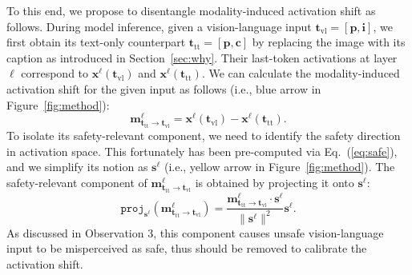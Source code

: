 To this end, we propose to disentangle modality-induced activation shift as follows. During model inference, given a vision-language input $\mathbf{t}_\text{vl}=[\mathbf{p}, \mathbf{i}]$, we first obtain its text-only counterpart $\mathbf{t}_\text{tt}=[\mathbf{p}, \mathbf{c}]$ by replacing the image with its caption as introduced in Section~\ref{sec:why}. Their last-token activations at layer $\ell$ correspond to $\mathbf{x}^\ell (\mathbf{t}_\text{vl})$ and $\mathbf{x}^\ell (\mathbf{t}_\text{tt})$. We can calculate the modality-induced activation shift for the given input as follows (i.e., blue arrow in Figure~\ref{fig:method}):
\begin{equation}
    \mathbf{m}^\ell_{\mathbf{t}_\text{tt}\rightarrow \mathbf{t}_\text{vl}} = \mathbf{x}^\ell (\mathbf{t}_\text{vl}) - \mathbf{x}^\ell (\mathbf{t}_\text{tt}).
\end{equation}
To isolate its safety-relevant component, we need to identify the safety direction in activation space. This fortunately has been pre-computed via Eq.~(\ref{eq:safe}), and we simplify its notion as $\mathbf{s}^\ell$ (i.e., yellow arrow in Figure~\ref{fig:method}). The safety-relevant component of $\mathbf{m}^\ell_{\mathbf{t}_\text{tt}\rightarrow \mathbf{t}_\text{vl}}$ is obtained by projecting it onto $\mathbf{s}^\ell$:
\begin{equation}
    \mathtt{proj}_{\mathbf{s}^\ell}(\mathbf{m}^\ell_{\mathbf{t}_\text{tt}\rightarrow \mathbf{t}_\text{vl}})=\frac{\mathbf{m}^\ell_{\mathbf{t}_\text{tt}\rightarrow \mathbf{t}_\text{vl}}\cdot \mathbf{s}^\ell}{\|\mathbf{s}^\ell\|^2}\mathbf{s}^\ell.
\end{equation}
As discussed in Observation 3, this component causes unsafe vision-language input to be misperceived as safe, thus should be removed to calibrate the activation shift. 

